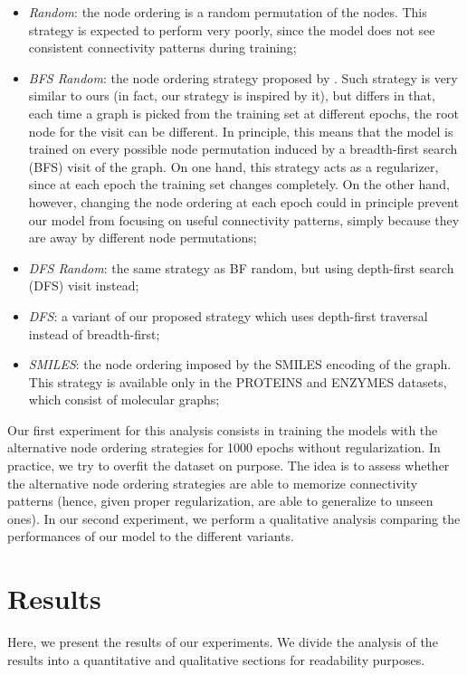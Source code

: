 \begin{itemize}
    \item \emph{Random}: the node ordering is a random permutation of the nodes. This strategy is expected to perform very poorly, since the model does not see consistent connectivity patterns during training;
    \item \emph{BFS Random}: the node ordering strategy proposed by \citet{you2018graphrnn}. Such strategy is very similar to ours (in fact, our strategy is inspired by it), but differs in that, each time a graph is picked from the training set at different epochs, the root node for the visit can be different. In principle, this means that the model is trained on every possible node permutation induced by a breadth-first search (BFS) visit of the graph. On one hand, this strategy acts as a regularizer, since at each epoch the training set changes completely. On the other hand, however, changing the node ordering at each epoch could in principle prevent our model from focusing on useful connectivity patterns, simply because they are  away by different node permutations;
    \item \emph{DFS Random}: the same strategy as BF random, but using depth-first search (DFS) visit instead;
    \item \emph{DFS}: a variant of our proposed strategy which uses depth-first traversal instead of breadth-first;
    \item \emph{SMILES}: the node ordering imposed by the SMILES encoding of the graph. This strategy is available only in the PROTEINS and ENZYMES datasets, which consist of molecular graphs;
\end{itemize}
Our first experiment for this analysis consists in training the models with the alternative node ordering strategies for 1000 epochs without regularization. In practice, we try to overfit the dataset on purpose. The idea is to assess whether the alternative node ordering strategies are able to memorize connectivity patterns (hence, given proper regularization, are able to generalize to unseen ones). In our second experiment, we perform a qualitative analysis comparing the performances of our model to the different variants.

\section{Results}
Here, we present the results of our experiments. We divide the analysis of the results into a quantitative and qualitative sections for readability purposes.

